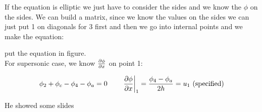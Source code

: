 If the equation is elliptic we just have to consider the sides and we know the $\phi$ on the sides. We can build a matrix, since we know the values on the sides we can just put 1 on diagonals for 3 first and then we go into internal points and we make the equation: 

put the equation in figure. \\

For supersonic case, we know $\frac{\partial \phi }{\partial x}$ on point 1: 

\begin{equation}
\phi _2 + \phi _c - \phi _4 - \phi _a = 0 \qquad \left.\frac{\partial \phi}{\partial x} \right| _1 = \frac{\phi _4 - \phi _a}{2h} = u_1 \mbox{ (specified)}
\end{equation}

He showed some slides 

